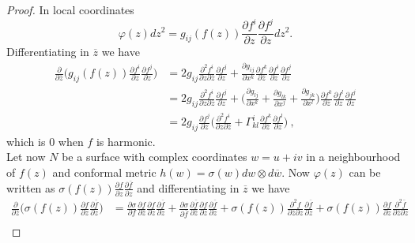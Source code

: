 \begin{proof}
    In local coordinates
    \[
        \varphi(z)dz^2 = g_{ij}(f(z)) \frac{\partial f^i}{\partial z}  \frac{\partial f^j}{\partial z} dz^2. 
    \]
    Differentiating in $\overline{z}$ we have
    \[
    \begin{split}
       \frac{ \partial}{\partial \overline{z}} \Big(g_{ij}(f(z)) \frac{\partial f^i}{\partial z}  \frac{\partial f^j}{\partial z} \Big) & = 2 g_{ij} \frac{\partial^2 f^i}{\partial z \partial \overline{z}} \frac{\partial f^j}{\partial z} + \frac{\partial g_{ij}}{\partial x^k} \frac{\partial f^k}{\partial \overline{z}} \frac{\partial f^i}{\partial z} \frac{\partial f^j}{\partial z} \\
       & = 2 g_{ij} \frac{\partial^2 f^i}{\partial z \partial \overline{z}} \frac{\partial f^j}{\partial z} + \Big(\frac{\partial g_{lj}}{\partial x^k} + \frac{\partial g_{lk}}{\partial x^j} + \frac{\partial g_{jk}}{\partial x^l} \Big) \frac{\partial f^k}{\partial \overline{z}} \frac{\partial f^l}{\partial z} \frac{\partial f^j}{\partial z}  \\
       & = 2 g_{ij} \frac{\partial f^j}{\partial z} \Big( \frac{\partial^2 f^i}{\partial z \partial \overline{z}} + \Gamma^i_{kl}  \frac{\partial f^k}{\partial \overline{z}} \frac{\partial f^l}{\partial z} \Big) \ ,
    \end{split}
    \]
    which is $0$ when $f$ is harmonic.\\
    Let now $N$ be a surface with complex coordinates $w = u + iv$ in a neighbourhood of $f(z)$ and conformal metric $h(w) = \sigma(w) dw \otimes d\overline{w}$. Now $\varphi(z)$ can be written as $\sigma(f(z)) \frac{\partial f}{ \partial z} \frac{\partial \overline{f}}{\partial z}$ and differentiating in $\overline{z}$ we have
    \[
    \begin{split}
        \frac{ \partial}{\partial \overline{z}}\Big(\sigma(f(z)) \frac{\partial f}{ \partial z}  \frac{\partial \overline{f}}{\partial z} \Big) & = 
        \frac{\partial \sigma}{\partial f} \frac{\partial f}{\partial \overline{z}} \frac{\partial f}{ \partial z} \frac{\partial \overline{f}}{\partial z} +
        \frac{\partial \sigma}{\partial \overline{f}} \frac{\partial \overline{f}}{\partial \overline{z}} \frac{\partial f}{ \partial z} \frac{\partial \overline{f}}{\partial z} +
        \sigma(f(z)) \frac{\partial^2 f}{\partial \overline{z} \partial z} \frac{\partial \overline{f}}{\partial z} +
        \sigma(f(z)) \frac{\partial f}{ \partial z} \frac{\partial^2 \overline{f}}{\partial \overline{z} \partial z} \\

\end{split}\]
\end{proof}
